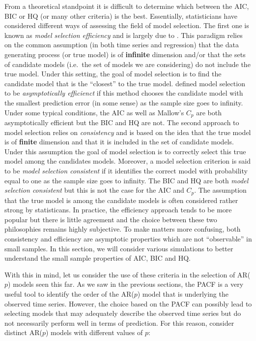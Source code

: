 \documentclass[]{book}
\theoremstyle{definition}
\theoremstyle{definition}
\theoremstyle{definition}
\theoremstyle{remark}
\begin{document}
From a theoretical standpoint it is difficult to determine which between
the AIC, BIC or HQ (or many other criteria) is the best. Essentially,
statisticians have considered different ways of assessing the field of
model selection. The first one is known as \emph{model selection
efficiency} and is largely due to \citet{shibata1980asymptotically}.
This paradigm relies on the common assumption (in both time series and
regression) that the data generating process (or true model) is of
\textbf{infinite} dimension and/or that the sets of candidate models
(i.e.~the set of models we are considering) do not include the true
model. Under this setting, the goal of model selection is to find the
candidate model that is the ``closest'' to the true model.
\citet{shibata1980asymptotically} defined model selection to be
\emph{asymptotically efficienct} if this method chooses the candidate
model with the smallest prediction error (in some sense) as the sample
size goes to infinity. Under some typical conditions, the AIC as well as
Mallow's \(C_p\) are both asymptotically efficient but the BIC and HQ
are not. The second approach to model selection relies on
\emph{consistency} and is based on the idea that the true model is of
\textbf{finite} dimension and that it is included in the set of
candidate models. Under this assumption the goal of model selection is
to correctly select this true model among the candidates models.
Moreover, a model selection criterion is said to be \emph{model
selection consistent} if it identifies the correct model with
probability equal to one as the sample size goes to infinity. The BIC
and HQ are both \emph{model selection consistent} but this is not the
case for the AIC and \(C_p\). The assumption that the true model is
among the candidate models is often considered rather strong by
statisticans. In practice, the efficiency approach tends to be more
popular but there is little agreement and the choice between these two
philosophies remains highly subjective. To make matters more confusing,
both consistency and efficiency are asymptotic properties which are not
``observable'' in small samples. In this section, we will consider
various simulations to better understand the small sample properties of
AIC, BIC and HQ.

With this in mind, let us consider the use of these criteria in the
selection of AR(\(p\)) models seen this far. As we saw in the previous
sections, the PACF is a very useful tool to identify the order of the
AR(\(p\)) model that is underlying the observed time series. However,
the choice based on the PACF can possibly lead to selecting models that
may adequately describe the observed time series but do not necessarily
perform well in terms of prediction. For this reason, consider distinct
AR(\(p\)) models with different values of \(p\):
\end{document}
